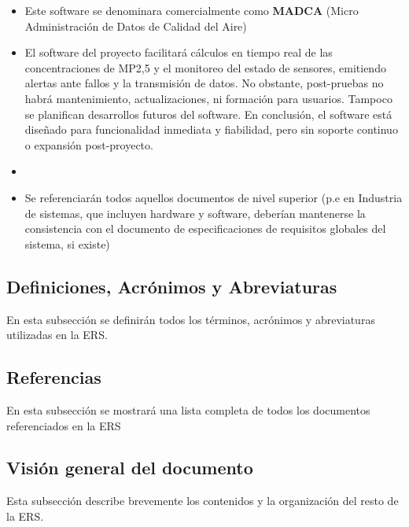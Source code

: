 \documentclass[12pt,a4paper, twosite]{article}
\begin{document}
\begin{itemize}
\item Este software se denominara comercialmente como \textbf{MADCA} (Micro Administración de Datos de Calidad del Aire)

\item El software del proyecto facilitará cálculos en tiempo real de las concentraciones de MP2,5 y el monitoreo del estado de sensores, emitiendo alertas ante fallos y la transmisión de datos. No obstante, post-pruebas no habrá mantenimiento, actualizaciones, ni formación para usuarios. Tampoco se planifican desarrollos futuros del software. En conclusión, el software está diseñado para funcionalidad inmediata y fiabilidad, pero sin soporte continuo o expansión post-proyecto.

\item 

\item Se referenciarán todos aquellos documentos de nivel superior (p.e en
Industria de sistemas, que incluyen hardware y software, deberían
mantenerse la consistencia con el documento de especificaciones de
requisitos globales del sistema, si existe)
\end{itemize}


\subsection{Definiciones, Acrónimos y Abreviaturas}
\label{sec:orgb158e36}

En esta subsección se definirán todos los términos, acrónimos y
abreviaturas utilizadas en la ERS.


\subsection{Referencias}
\label{sec:org62711e0}

En esta subsección se mostrará una lista completa de todos los
documentos referenciados en la ERS


\subsection{Visión general del documento}
\label{sec:orgdaca22c}

Esta subsección describe brevemente los contenidos y la organización
del resto de la ERS.
\end{document}

